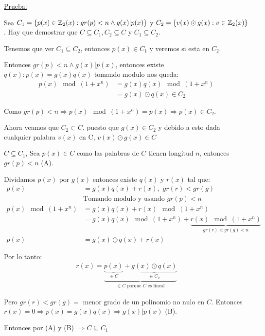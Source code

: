 \documentclass[12pt,a4paper]{article}
\begin{document}
\underline{Prueba:}
\medskip

Sea $C_{1} = \left\lbrace p(x)\in \mathbb{Z}_{2}(x): gr(p)<n \wedge g(x)|p(x) \right\rbrace$ y
$C_{2} = \left\lbrace v(x)\odot g(x): v\in \mathbb{Z}_{2}(x) \right\rbrace$. Hay que demostrar que 
$C \subseteq C_{1}, C_{2} \subseteq C$ y $C_{1} \subseteq C_{2}$.
\medskip

Tenemos que ver $C_{1} \subseteq C_{2}$, entonces $p(x) \in C_{1}$ y veremos si 
esta en $C_{2}$.
\medskip

Entonces $gr(p)<n \wedge g(x)|p(x)$, entonces existe $q(x): p(x) = g(x)q(x)$
tomando modulo nos queda:
\begin{align*}
    p(x) \mod (1+x^{n}) &= g(x)q(x)\mod (1+x^{n})\\
    &= g(x) \odot q(x) \in C_{2}
\end{align*}

Como $gr(p) < n \Rightarrow p(x) \mod (1+x^{n}) = p(x) \Rightarrow p(x) \in C_{2}$.
\medskip

Ahora veamos que $C_{2} \subset C$, puesto que $g(x) \in C_{2}$ y debido a esto dada 
cualquier palabra $v(x)$ en C, $v(x) \odot g(x) \in C$
\medskip

$C \subseteq C_{1}$, Sea $p(x) \in C$ como las palabras de $C$ tienen longitud $n$, 
entonces $gr(p) < n$ (A).
\medskip

Dividamos $p(x)$ por $g(x)$ entonces existe $q(x)$ y $r(x)$ tal que:
\begin{align*}
    p(x) &= g(x)q(x) + r(x), \,\, gr(r) < gr(g)\\
    &\text{Tomando modulo y usando $gr(p)<n$}\\
    p(x) \mod (1+x^{n}) &= g(x)q(x) + r(x) \mod (1+x^{n})\\
    &= g(x)q(x) \mod (1+x^{n}) + \underbrace{r(x) \mod (1+x^{n})}_{gr(r)<gr(g)<n}\\
    p(x) &= g(x) \odot q(x) + r(x)
\end{align*}

Por lo tanto:
\begin{align*}
    r(x) = \underbrace{\underbrace{p(x)}_{\in C} + \underbrace{g(x) \odot q(x)}_{\in C_{2}}}_{\in C\,\,\text{porque $C$ es lineal}}
\end{align*}

Pero $gr(r) < gr(g) = \,\,\text{menor grado de un polinomio no nulo en $C$}$. 
Entonces $r(x) = 0 \Rightarrow p(x) = g(x)q(x) \Rightarrow g(x)|p(x)$ (B).
\medskip

Entonces por (A) y (B) $\Rightarrow C \subseteq C_{1}$
\medskip
\end{document}
